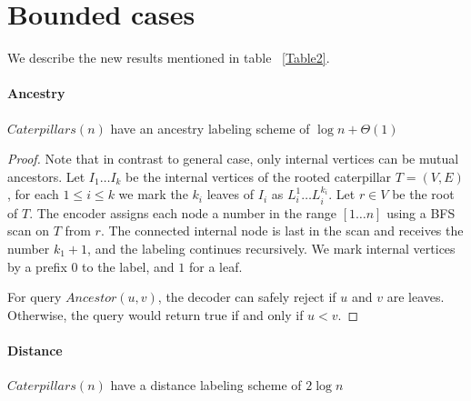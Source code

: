 \section{Bounded cases}\label{section:bounded-cases}
We describe the new results mentioned in table ~\ref{Table2}.
\paragraph{Ancestry}
	\begin{thm} \label{thm:cat-anc}
		 $Caterpillars(n)$ have an ancestry  labeling scheme of $ \log n + \Theta(1)$
	\end{thm}
		\begin{proof}
			 Note that in contrast to general case,  only internal vertices can be mutual ancestors.
	 		Let $I_1 \dots I_k$ be the internal vertices of the rooted caterpillar $T = (V,E)$, for each  $1 \leq i \leq k$ we mark the $k_i$ leaves of $I_i$ as $L_i^1 \dots L_i^{k_i}$.
			Let $r  \in V$ be the root of $T$. 
			The encoder assigns  each node  a number in the range $[1 \dots n]$ using a BFS scan on $T$ from $r$.
			The connected internal node is last in the scan and receives the number $k_1 +1$, and the labeling continues recursively.
			We mark internal vertices by a prefix $0$ to the label, and $1$  for a leaf.
			
			For query $Ancestor(u,v)$, the decoder can safely reject if $u$ and $v$ are leaves.
			Otherwise, the query would return true if and only if $u<v$.
		 \end{proof}
 \paragraph{Distance}
	 \begin{thm} \label{thm:cat-dist}
	 $Caterpillars(n)$ have a distance labeling scheme of $2 \log n$
	 \end{thm}
	 
